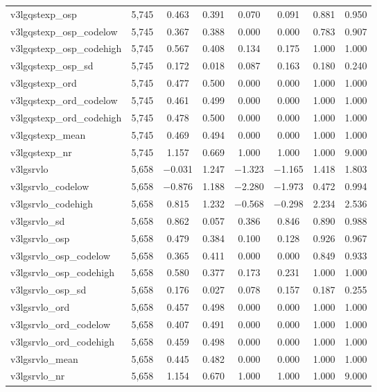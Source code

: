 \begin{table}[!htbp]
\begin{tabular}{@{\extracolsep{5pt}}lccccccc}
v3lgqstexp\_osp & 5,745 & 0.463 & 0.391 & 0.070 & 0.091 & 0.881 & 0.950 \\ 
v3lgqstexp\_osp\_codelow & 5,745 & 0.367 & 0.388 & 0.000 & 0.000 & 0.783 & 0.907 \\ 
v3lgqstexp\_osp\_codehigh & 5,745 & 0.567 & 0.408 & 0.134 & 0.175 & 1.000 & 1.000 \\ 
v3lgqstexp\_osp\_sd & 5,745 & 0.172 & 0.018 & 0.087 & 0.163 & 0.180 & 0.240 \\ 
v3lgqstexp\_ord & 5,745 & 0.477 & 0.500 & 0.000 & 0.000 & 1.000 & 1.000 \\ 
v3lgqstexp\_ord\_codelow & 5,745 & 0.461 & 0.499 & 0.000 & 0.000 & 1.000 & 1.000 \\ 
v3lgqstexp\_ord\_codehigh & 5,745 & 0.478 & 0.500 & 0.000 & 0.000 & 1.000 & 1.000 \\ 
v3lgqstexp\_mean & 5,745 & 0.469 & 0.494 & 0.000 & 0.000 & 1.000 & 1.000 \\ 
v3lgqstexp\_nr & 5,745 & 1.157 & 0.669 & 1.000 & 1.000 & 1.000 & 9.000 \\ 
v3lgsrvlo & 5,658 & $-$0.031 & 1.247 & $-$1.323 & $-$1.165 & 1.418 & 1.803 \\ 
v3lgsrvlo\_codelow & 5,658 & $-$0.876 & 1.188 & $-$2.280 & $-$1.973 & 0.472 & 0.994 \\ 
v3lgsrvlo\_codehigh & 5,658 & 0.815 & 1.232 & $-$0.568 & $-$0.298 & 2.234 & 2.536 \\ 
v3lgsrvlo\_sd & 5,658 & 0.862 & 0.057 & 0.386 & 0.846 & 0.890 & 0.988 \\ 
v3lgsrvlo\_osp & 5,658 & 0.479 & 0.384 & 0.100 & 0.128 & 0.926 & 0.967 \\ 
v3lgsrvlo\_osp\_codelow & 5,658 & 0.365 & 0.411 & 0.000 & 0.000 & 0.849 & 0.933 \\ 
v3lgsrvlo\_osp\_codehigh & 5,658 & 0.580 & 0.377 & 0.173 & 0.231 & 1.000 & 1.000 \\ 
v3lgsrvlo\_osp\_sd & 5,658 & 0.176 & 0.027 & 0.078 & 0.157 & 0.187 & 0.255 \\ 
v3lgsrvlo\_ord & 5,658 & 0.457 & 0.498 & 0.000 & 0.000 & 1.000 & 1.000 \\ 
v3lgsrvlo\_ord\_codelow & 5,658 & 0.407 & 0.491 & 0.000 & 0.000 & 1.000 & 1.000 \\ 
v3lgsrvlo\_ord\_codehigh & 5,658 & 0.459 & 0.498 & 0.000 & 0.000 & 1.000 & 1.000 \\ 
v3lgsrvlo\_mean & 5,658 & 0.445 & 0.482 & 0.000 & 0.000 & 1.000 & 1.000 \\ 
v3lgsrvlo\_nr & 5,658 & 1.154 & 0.670 & 1.000 & 1.000 & 1.000 & 9.000 \\ 

\end{tabular}
\end{table}
